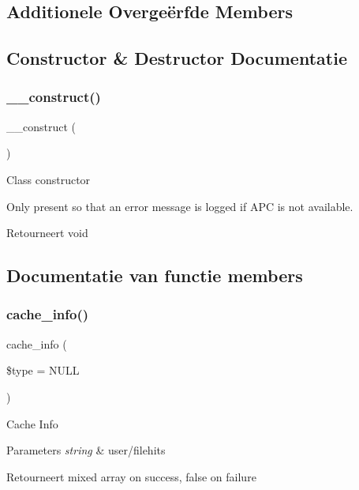 \subsection*{Additionele Overge\"{e}rfde Members}


\subsection{Constructor \& Destructor Documentatie}
\mbox{\label{class_c_i___cache__apc_a095c5d389db211932136b53f25f39685}} 
\subsubsection{\texorpdfstring{\_\_construct()}{\_\_construct()}}
{\footnotesize\ttfamily \+\_\+\+\_\+construct (\begin{DoxyParamCaption}{ }\end{DoxyParamCaption})}

Class constructor

Only present so that an error message is logged if A\+PC is not available.

\begin{DoxyReturn}{Retourneert}
void 
\end{DoxyReturn}


\subsection{Documentatie van functie members}
\mbox{\label{class_c_i___cache__apc_aa8b9c4d9f0387156736ccd8850f0727e}} 
\subsubsection{\texorpdfstring{cache\_info()}{cache\_info()}}
{\footnotesize\ttfamily cache\+\_\+info (\begin{DoxyParamCaption}\item[{}]{\$type = {\ttfamily NULL} }\end{DoxyParamCaption})}

Cache Info


\begin{DoxyParams}{Parameters}
{\em string} & user/filehits \\
\hline
\end{DoxyParams}
\begin{DoxyReturn}{Retourneert}
mixed array on success, false on failure 
\end{DoxyReturn}
\mbox{\label{class_c_i___cache__apc_adb40b812890a8bc058bf6b7a0e1a54d9}} 
